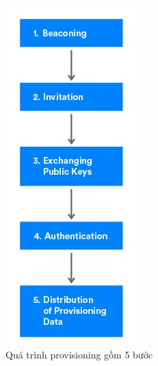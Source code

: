             \begin{figure}[h!]
            	\begin{center}
            		\includegraphics[scale=0.8]{images/mesh-management-fig2.jpg}
            		\caption{Quá trình provisioning gồm 5 bước}
            	\end{center}
            \end{figure}

